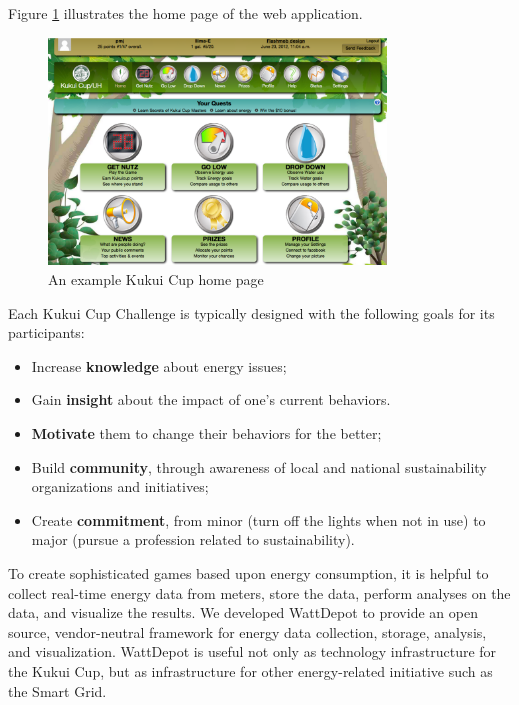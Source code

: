 \documentclass[jou]{apa} %
\begin{document}

Figure \ref{fig:kukuicup-home-page} illustrates the home page of the web application. 

\begin{figure}[htbp]
\begin{center}
\includegraphics[width=0.8\textwidth]{kc-homepage.eps}
\caption{An example Kukui Cup home page}
\label{fig:kukuicup-home-page}
\end{center}
\end{figure}


Each Kukui Cup Challenge is typically designed with the following goals for its participants:
\begin{itemize}
\item Increase {\bf knowledge} about energy issues;
\item Gain {\bf insight} about the impact of one's current behaviors.
\item {\bf Motivate} them to change their behaviors for the better;
\item Build {\bf community}, through awareness of local and national sustainability organizations and initiatives;
\item Create {\bf commitment}, from minor (turn off the lights when not in use) to major (pursue a profession related to sustainability).
\end{itemize}

To create sophisticated games based upon energy consumption, it is helpful to collect
real-time energy data from meters, store the data, perform analyses on the data, and
visualize the results. We developed WattDepot \cite{csdl2-10-05} to provide an open
source, vendor-neutral framework for energy data collection, storage, analysis, and
visualization.  WattDepot is useful not only as technology infrastructure for the Kukui
Cup, but as infrastructure for other energy-related initiative such as the Smart Grid.
\end{document}

